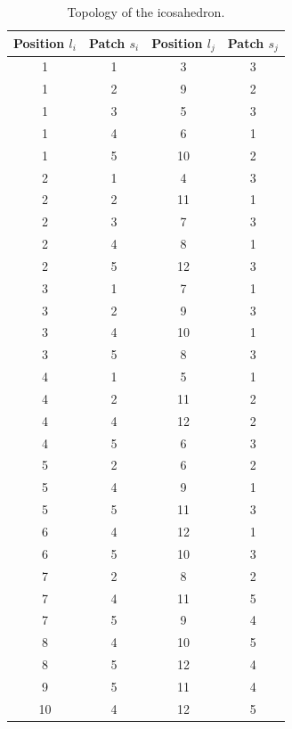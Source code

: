 \documentclass[a4paper, amsfonts, amssymb, amsmath, reprint, showkeys, nofootinbib, oneside]{revtex4-1}
\begin{document}
\begin{table}[h!]
	\begin{tabular}{ cccc } 
		\hline
		Position $l_i$ & Patch $s_i$ & Position $l_j$ & Patch $s_j$ \\
		\hline
		1 & 1 & 3 & 3 \\
		1 & 2 & 9 & 2 \\
		1 & 3 & 5 & 3 \\
		1 & 4 & 6 & 1 \\
		1 & 5 & 10 & 2 \\
		2 & 1 & 4 & 3 \\
		2 & 2 & 11 & 1 \\
		2 & 3 & 7 & 3 \\
		2 & 4 & 8 & 1 \\
		2 & 5 & 12 & 3 \\
		3 & 1 & 7 & 1 \\
		3 & 2 & 9 & 3 \\
		3 & 4 & 10 & 1 \\
		3 & 5 & 8 & 3 \\
		4 & 1 & 5 & 1 \\
		4 & 2 & 11 & 2 \\
		4 & 4 & 12 & 2 \\
		4 & 5 & 6 & 3 \\
		5 & 2 & 6 & 2 \\
		5 & 4 & 9 & 1 \\
		5 & 5 & 11 & 3 \\
		6 & 4 & 12 & 1 \\
		6 & 5 & 10 & 3 \\
		7 & 2 & 8 & 2 \\
		7 & 4 & 11 & 5 \\
		7 & 5 & 9 & 4 \\
		8 & 4 & 10 & 5 \\
		8 & 5 & 12 & 4 \\
		9 & 5 & 11 & 4 \\
		10 & 4 & 12 & 5 \\
		\hline
	\end{tabular}
	\caption{Topology of the icosahedron.}
\end{table}
\end{document}
